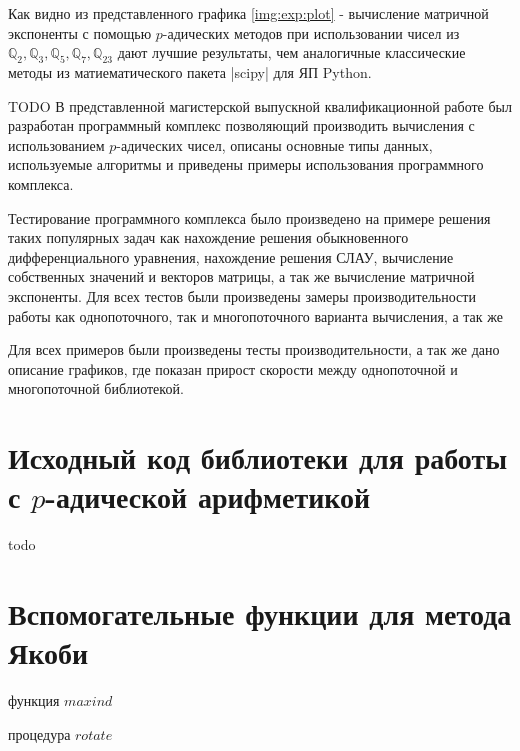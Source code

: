 \documentclass[master, och, diploma, times]{sty/SCWorks}
\theoremstyle{plain}
\theoremstyle{definition}
\numberwithin{equation}{section}
\begin{document}
Как видно из представленного графика \ref{img:exp:plot} - вычисление матричной экспоненты с помощью $p$-адических методов при использовании чисел из $\mathbb{Q}_2, \mathbb{Q}_3, \mathbb{Q}_5, \mathbb{Q}_7, \mathbb{Q}_{23}$ дают лучшие результаты, чем аналогичные классические методы из матиематического пакета |scipy| для ЯП Python.


\conclusion
TODO
В представленной магистерской выпускной квалификационной работе был разработан программный комплекс позволяющий производить вычисления с использованием $p$-адических чисел, описаны основные типы данных, используемые алгоритмы и приведены примеры использования программного комплекса.

Тестирование программного комплекса было произведено на примере решения таких популярных задач как нахождение решения обыкновенного дифференциального уравнения, нахождение решения СЛАУ, вычисление собственных значений и векторов матрицы, а так же вычисление матричной экспоненты. Для всех тестов были произведены замеры производительности работы как однопоточного, так и многопоточного варианта вычисления, а так же 


Для всех примеров были произведены тесты производительности, а так же дано описание графиков, где показан прирост скорости между однопоточной и многопоточной библиотекой.






\appendix

\section{Исходный код библиотеки для работы с $p$-адической арифметикой}
todo

\section{Вспомогательные функции для метода Якоби}
\begin{algorithm}
\DontPrintSemicolon %
\caption{функция $maxind$}
\end{algorithm}

\begin{algorithm}
\DontPrintSemicolon %
\caption{процедура $rotate$}
\end{algorithm}
\end{document}
